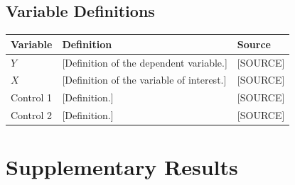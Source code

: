 \begin{appendices}


\begin{singlespace}
\chapter{Variable Definitions}\label{app:variables}
\end{singlespace}

\begin{table}[htbp]
    \centering
    \begin{tabular}{p{3cm}p{7cm}p{3cm}}
        \toprule
        Variable & Definition & Source \\
        \midrule
        $Y$       & [Definition of the dependent variable.]      & [SOURCE] \\
        $X$       & [Definition of the variable of interest.]    & [SOURCE] \\
        Control 1 & [Definition.]                                & [SOURCE] \\
        Control 2 & [Definition.]                                & [SOURCE] \\
        \bottomrule
    \end{tabular}
\end{table}

\chapter{Supplementary Results}\label{app:supplementary}
\lipsum[1]

\end{appendices}
